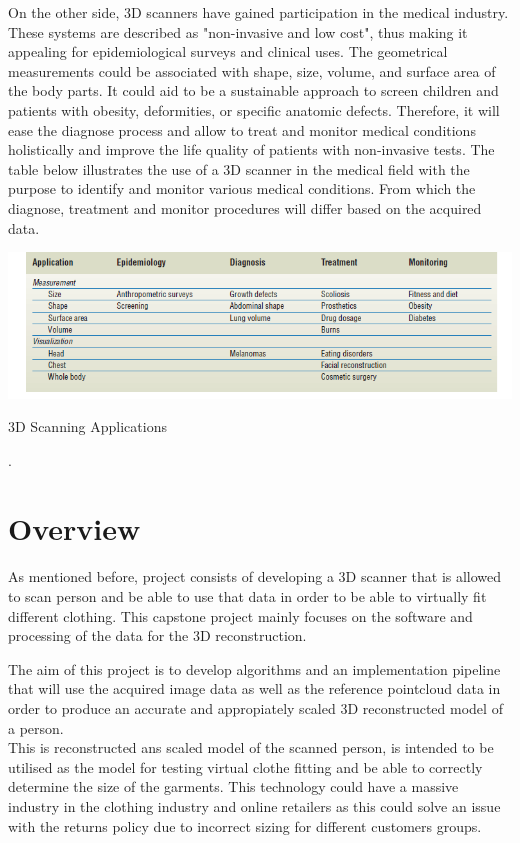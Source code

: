 \documentclass[12pt]{report}
\begin{document}
On the other side, 3D scanners have gained participation in the medical industry. These systems are described as "non-invasive and low cost", thus making it appealing for epidemiological surveys and clinical uses. 
The geometrical measurements could be associated with shape, size, volume, and surface area of the body parts. It could aid to be a sustainable approach to screen children and patients with obesity, deformities, or specific anatomic defects. 
Therefore, it will ease the diagnose process and allow to treat and monitor medical conditions holistically and improve the life quality of patients with non-invasive tests.
The table below illustrates the use of a 3D scanner in the medical field with the purpose to identify and monitor various medical conditions. 
From which the diagnose, treatment and monitor procedures will differ based on the acquired data.
\begin{table}[ht]
    \centering
    \includegraphics[width=15cm]{table1.png}
    \caption{3D Scanning Applications}\cite[]{treleaven_wells_2007}.
\end{table}

\section{Overview}
As mentioned before, project consists of developing a 3D scanner that is allowed to scan person and be able to use that data in order to be able to virtually fit different clothing.
This capstone project mainly focuses on the software and processing of the data for the 3D reconstruction.

The aim of this project is to develop algorithms and an implementation pipeline that will use the acquired image data as well as the reference pointcloud data in order to produce an accurate
and appropiately scaled 3D reconstructed model of a person.\\
This is reconstructed ans scaled model of the scanned person, is intended to be utilised as the model for testing virtual clothe fitting and be able to correctly determine the size of the garments. 
This technology could have a massive industry in the clothing industry and online retailers as this could solve an issue with the returns policy due to incorrect sizing for different customers groups.
\end{document}
